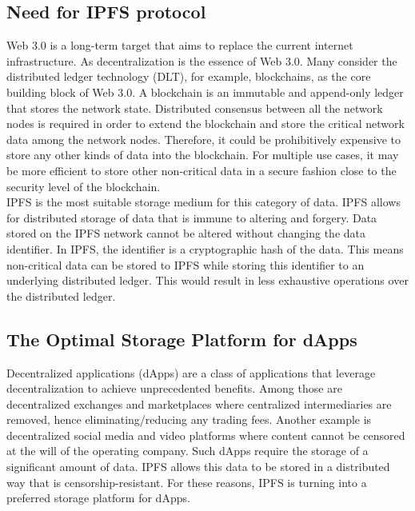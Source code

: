 \subsection{Need for IPFS protocol}

Web 3.0 is a long-term target that aims to replace the current internet infrastructure. As decentralization is the essence of Web 3.0. Many consider the distributed ledger technology (DLT), for example, blockchains, as the core building block of Web 3.0. A blockchain is an immutable and append-only ledger that stores the network state. Distributed consensus between all the network nodes is required in order to extend the blockchain and store the critical network data among the network nodes. Therefore, it could be prohibitively expensive to store any other kinds of data into the blockchain. For multiple use cases, it may be more efficient to store other non-critical data in a secure fashion close to the security level of the blockchain. \\[-8pt]

IPFS is the most suitable storage medium for this category of data. IPFS allows for distributed storage of data that is immune to altering and forgery. Data stored on the IPFS network cannot be altered without changing the data identifier. In IPFS, the identifier is a cryptographic hash of the data. This means non-critical data can be stored to IPFS while storing this identifier to an underlying distributed ledger. This would result in less exhaustive operations over the distributed ledger. \\[-8pt]

\subsection{The Optimal Storage Platform for dApps}

Decentralized applications (dApps) are a class of applications that leverage decentralization to achieve unprecedented benefits. Among those are decentralized exchanges and marketplaces where centralized intermediaries are removed, hence eliminating/reducing any trading fees. Another example is decentralized social media and video platforms where content cannot be censored at the will of the operating company. Such dApps require the storage of a significant amount of data. IPFS allows this data to be stored in a distributed way that is censorship-resistant. For these reasons, IPFS is turning into a preferred storage platform for dApps.